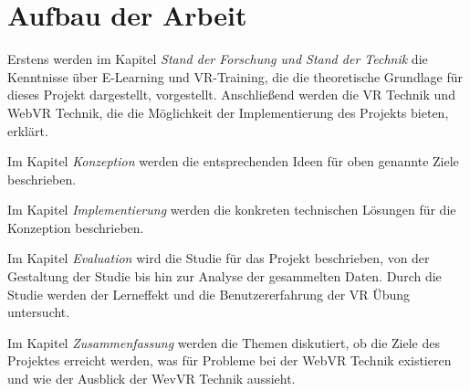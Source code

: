 \section{Aufbau der Arbeit}

Erstens werden im Kapitel {\em Stand der Forschung und Stand der Technik} die Kenntnisse über E-Learning und VR-Training, die die theoretische Grundlage für dieses Projekt dargestellt, vorgestellt. Anschließend werden die VR Technik und WebVR Technik, die die Möglichkeit der Implementierung des Projekts bieten, erklärt.

Im Kapitel {\em Konzeption} werden die entsprechenden Ideen für oben genannte Ziele beschrieben. 

Im Kapitel {\em Implementierung} werden die konkreten technischen Lösungen für die Konzeption beschrieben.

Im Kapitel {\em Evaluation} wird die Studie für das Projekt beschrieben, von der Gestaltung der Studie bis hin zur Analyse der gesammelten Daten. Durch die Studie werden der Lerneffekt und die Benutzererfahrung der VR Übung untersucht.

Im Kapitel {\em Zusammenfassung} werden die Themen diskutiert, ob die Ziele des Projektes erreicht werden, was für Probleme bei der WebVR Technik existieren und wie der Ausblick der WevVR Technik aussieht.
